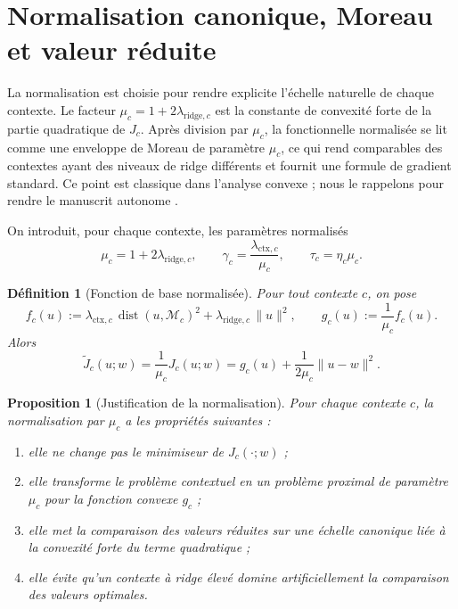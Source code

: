 \documentclass[11pt,a4paper]{article}
\newtheorem{definition}{Définition}[section]
\newtheorem{proposition}{Proposition}[section]
\DeclareMathOperator{\dist}{dist}
\newcommand{\Mcal}{\mathcal M}
\begin{document}
\section{Normalisation canonique, Moreau et valeur réduite}

La normalisation est choisie pour rendre explicite l'échelle naturelle de chaque contexte. Le facteur \(\mu_c=1+2\lambda_{\mathrm{ridge},c}\) est la constante de convexité forte de la partie quadratique de \(J_c\). Après division par \(\mu_c\), la fonctionnelle normalisée se lit comme une enveloppe de Moreau de paramètre \(\mu_c\), ce qui rend comparables des contextes ayant des niveaux de ridge différents et fournit une formule de gradient standard. Ce point est classique dans l'analyse convexe ; nous le rappelons pour rendre le manuscrit autonome \cite{Moreau1965,Rockafellar1970,BauschkeCombettes2017}.

On introduit, pour chaque contexte, les paramètres normalisés
\[
\mu_c = 1 + 2\lambda_{\mathrm{ridge},c},
\qquad
\gamma_c = \frac{\lambda_{\mathrm{ctx},c}}{\mu_c},
\qquad
\tau_c = \eta_c \mu_c.
\]

\begin{definition}[Fonction de base normalisée]
Pour tout contexte \(c\), on pose
\[
f_c(u):=\lambda_{\mathrm{ctx},c}\,\dist(u,\Mcal_c)^2+\lambda_{\mathrm{ridge},c}\,\|u\|^2,
\qquad
g_c(u):=\frac{1}{\mu_c}f_c(u).
\]
Alors
\[
\widetilde J_c(u;w)=\frac{1}{\mu_c}J_c(u;w)
=
g_c(u)+\frac{1}{2\mu_c}\|u-w\|^2.
\]
\end{definition}

\begin{proposition}[Justification de la normalisation]
Pour chaque contexte \(c\), la normalisation par \(\mu_c\) a les propriétés suivantes :
\begin{enumerate}[leftmargin=2em]
\item elle ne change pas le minimiseur de \(J_c(\cdot;w)\) ;
\item elle transforme le problème contextuel en un problème proximal de paramètre \(\mu_c\) pour la fonction convexe \(g_c\) ;
\item elle met la comparaison des valeurs réduites sur une échelle canonique liée à la convexité forte du terme quadratique ;
\item elle évite qu'un contexte à ridge élevé domine artificiellement la comparaison des valeurs optimales.
\end{enumerate}
\end{proposition}
\end{document}

